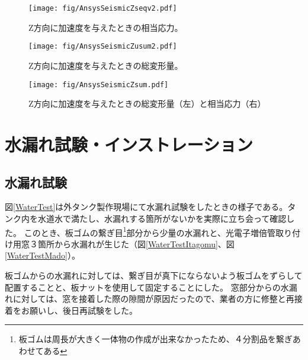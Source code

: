 \documentclass[11pt]{jreport}
\newcommand{\figref}[1]{図\ref{#1}}
\begin{document}
\begin{figure}[htbp]
\begin{minipage}{0.47\textwidth}
\centering
\texttt{[image: fig/AnsysSeismicZseqv2.pdf]}
\caption[Z方向に加速度を与えたときの相当応力]{Z方向に加速度を与えたときの相当応力。}
\label{SEQVZ}
\end{minipage}
\hfil
\begin{minipage}{0.47\textwidth}
\begin{center}
\texttt{[image: fig/AnsysSeismicZusum2.pdf]}
\caption[Z方向に加速度を与えたときの総変形量]{Z方向に加速度を与えたときの総変形量。}
\label{USUMZ}
\end{center}
\end{minipage}
\end{figure}
\fi%


\begin{figure}[htb]
\centering
\texttt{[image: fig/AnsysSeismicZsum.pdf]}
\caption[Z方向に加速度を与えたときの総変形量と相当応力]{Z方向に加速度を与えたときの総変形量（左）と相当応力（右）}
\label{SeismicZ}
\end{figure}

\newpage
\section{水漏れ試験・インストレーション}

\subsection{水漏れ試験}
\figref{WaterTest}は外タンク製作現場にて水漏れ試験をしたときの様子である。タンク内を水道水で満たし、水漏れする箇所がないかを実際に立ち会って確認した。
このとき、板ゴムの繋ぎ目\footnote{板ゴムは周長が大きく一体物の作成が出来なかったため、４分割品を繋ぎあわせてある}部分から少量の水漏れと、光電子増倍管取り付け用窓３箇所から水漏れが生じた（\figref{WaterTestItagomu}、\figref{WaterTestMado}）。

板ゴムからの水漏れに対しては、繋ぎ目が真下にならないよう板ゴムをずらして配置することと、板ナットを使用して固定することにした。
窓部分からの水漏れに対しては、窓を接着した際の隙間が原因だったので、業者の方に修整と再接着をお願いし、後日再試験をした。
\end{document}
